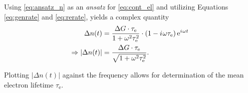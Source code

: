Using \autoref{eq:ansatz_n} as an \textit{ansatz} for \autoref{eq:cont_el} and utilizing Equations \ref{eq:genrate} and \ref{eq:rerate}, yields a complex quantity
\begin{align*}
	\Delta n(t) &= \frac{\Delta G\cdot\tau_\text{e}}{1+\omega^2\tau_\text{e}^2}\cdot\left(1 -{i\mkern1mu}\omega\tau_\text{e}\right)\mathrm{e}^{{i\mkern1mu}\omega t} \\
	\Rightarrow |\Delta n(t)| &= \frac{\Delta G\cdot\tau_\text{e}}{\sqrt{1+\omega^2\tau_\text{e}^2}}.
\end{align*}

Plotting $|\Delta n(t)|$ against the frequency allows for determination of the mean electron lifetime $\tau_\text{e}$.
